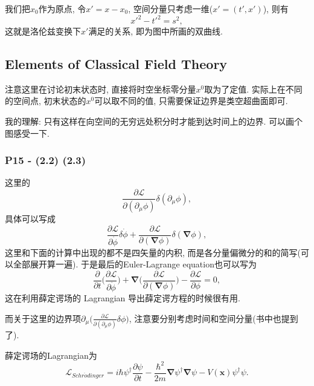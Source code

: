 \documentclass[cn,hazy,green,11pt,device=normal,chinesefont=founder]{elegantnote}
\begin{document}
我们把$x_0$作为原点, 令$x'=x-x_0$, 空间分量只考虑一维($x'=(t',x')$), 则有
\begin{equation}
  x'^2-t'^2=s^2,
\end{equation}
这就是洛伦兹变换下$x'$满足的关系, 即为图中所画的双曲线. 

\subsection{Elements of Classical Field Theory}

注意这里在讨论初末状态时, 直接将时空坐标零分量$x^0$取为了定值. 实际上在不同的空间点, 初末状态的$x^0$可以取不同的值, 只需要保证边界是类空超曲面即可. 

\begin{remark}
  我的理解: 只有这样在向空间的无穷远处积分时才能到达时间上的边界. 可以画个图感受一下. 
\end{remark}

\subsubsection{P15 - (2.2) (2.3)}

这里的
\begin{equation}
  \frac{\partial \mathcal{L}}{\partial(\partial_\mu \phi)}\delta(\partial_\mu \phi),
\end{equation}
具体可以写成
\begin{equation}
  \frac{\partial \mathcal{L}}{\partial\dot\phi}\delta  \dot{\phi}+\frac{\partial \mathcal{L}}{\partial(\boldsymbol{\nabla} \phi)}\delta(\boldsymbol{\nabla} \phi),
\end{equation}
这里和下面的计算中出现的都不是四矢量的内积, 而是各分量偏微分的和的简写(可以全部展开算一遍). 于是最后的Euler-Lagrange equation也可以写为
\begin{equation}
  \frac{\partial}{\partial t}\biggl(\frac{\partial \mathcal{L}}{\partial\dot\phi}\biggr) + \boldsymbol{\nabla} \biggl(\frac{\partial \mathcal{L}}{\partial(\boldsymbol{\nabla} \phi)}\biggr) - \frac{\partial \mathcal{L}}{\partial \phi} = 0,
\end{equation}
这在利用薛定谔场的 Lagrangian 导出薛定谔方程的时候很有用. 

而关于这里的边界项$\partial_\mu \bigl(\frac{\partial \mathcal{L}}{\partial(\partial_\mu \phi)}\delta \phi \bigr)$, 注意要分别考虑时间和空间分量(书中也提到了). 

\begin{note}
  薛定谔场的Lagrangian为
  \begin{equation}
    \mathcal{L}_{Schr\ddot{o}dinger} = i\hbar\psi^\dagger\frac{\partial \psi}{\partial t} - \frac{\hbar^2}{2m}\boldsymbol{\nabla}\psi^\dagger\boldsymbol{\nabla}\psi - V(\mathbf x)\psi^\dagger\psi.
  \end{equation}
\end{note}
\end{document}
